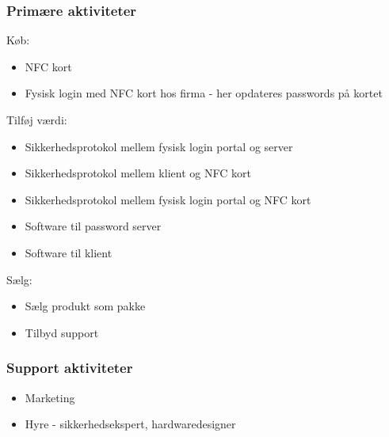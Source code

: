 \subsubsection*{Primære aktiviteter}
Køb:
\begin{itemize}
\item NFC kort
\item Fysisk login med NFC kort hos firma - her opdateres passwords på kortet
\end{itemize}
Tilføj værdi:
\begin{itemize}
\item Sikkerhedsprotokol mellem fysisk login portal og server
\item Sikkerhedsprotokol mellem klient og NFC kort
\item Sikkerhedsprotokol mellem fysisk login portal og NFC kort
\item Software til password server
\item Software til klient
\end{itemize}
Sælg:
\begin{itemize}
\item Sælg produkt som pakke
\item Tilbyd support
\end{itemize}

\subsubsection*{Support aktiviteter}
\begin{itemize}
\item Marketing
\item Hyre - sikkerhedsekspert, hardwaredesigner
\end{itemize}